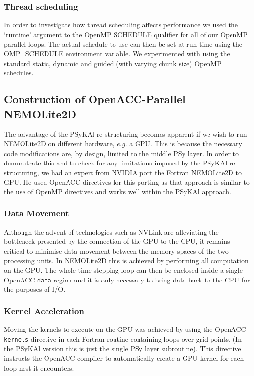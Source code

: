 \documentclass[gmd, manuscript]{copernicus}
\begin{document}
\subsubsection{Thread scheduling}
\label{sec_scheduling}

In order to investigate how thread scheduling affects performance we
used the `runtime' argument to the OpenMP SCHEDULE qualifier for all
of our OpenMP parallel loops. The actual schedule to use can then be
set at run-time using the OMP\_SCHEDULE environment variable. We
experimented with using the standard static, dynamic and guided (with
varying chunk size) OpenMP schedules.

\subsection{Construction of OpenACC-Parallel NEMOLite2D}
\label{sec_oacc_steps}

The advantage of the {PS}y{KA}l re-structuring becomes apparent if we
wish to run NEMOLite2D on different hardware, \textit{e.g.} a
GPU. This is because the necessary code modifications are, by design,
limited to the middle PSy layer. In order to demonstrate this and to
check for any limitations imposed by the {PS}y{KA}l re-structuring, we
had an expert from NVIDIA port the Fortran NEMOLite2D to GPU. He
used OpenACC directives for this porting as that approach is similar
to the use of OpenMP directives and works well within the {PS}y{KA}l
approach.

\subsubsection{Data Movement}

Although the advent of technologies such as NVLink are alleviating the
bottleneck presented by the connection of the GPU to the CPU, it
remains critical to minimise data movement between the memory spaces
of the two processing units. In NEMOLite2D this is achieved by
performing all computation on the GPU. The whole time-stepping loop
can then be enclosed inside a single OpenACC \texttt{data} region and it
is only necessary to bring data back to the CPU for the purposes
of I/O.

\subsubsection{Kernel Acceleration}

Moving the kernels to execute on the GPU was achieved by using the
OpenACC \texttt{kernels} directive in each Fortran routine containing
loops over grid points. (In the {PS}y{KA}l version this is just the
single {PS}y layer subroutine). This directive instructs the OpenACC
compiler to automatically create a GPU kernel for each loop nest it
encounters.
\end{document}
